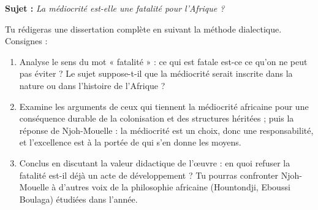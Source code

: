 \documentclass[11pt]{article}
\begin{document}
\begin{exercice}
\textbf{Sujet :} \emph{La médiocrité est-elle une fatalité pour l'Afrique ?}

Tu rédigeras une dissertation complète en suivant la méthode dialectique. Consignes :

\begin{enumerate}
\item Analyse le sens du mot « fatalité » : ce qui est fatale est-ce ce qu'on ne peut pas éviter ? Le sujet suppose-t-il que la médiocrité serait inscrite dans la nature ou dans l'histoire de l'Afrique ?
\item Examine les arguments de ceux qui tiennent la médiocrité africaine pour une conséquence durable de la colonisation et des structures héritées ; puis la réponse de Njoh-Mouelle : la médiocrité est un choix, donc une responsabilité, et l'excellence est à la portée de qui s'en donne les moyens.
\item Conclus en discutant la valeur didactique de l'œuvre : en quoi refuser la fatalité est-il déjà un acte de développement ? Tu pourras confronter Njoh-Mouelle à d'autres voix de la philosophie africaine (Hountondji, Eboussi Boulaga) étudiées dans l'année.
\end{enumerate}
\end{exercice}
\end{document}
